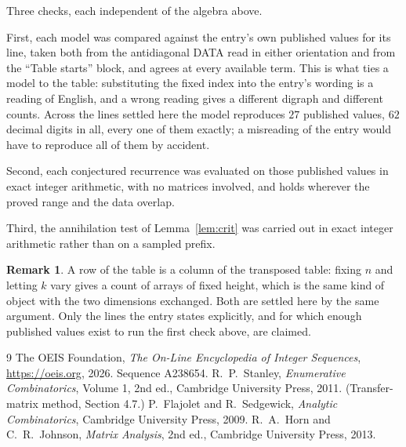 \documentclass[11pt,a4paper]{article}
\theoremstyle{plain}
\theoremstyle{definition}
\newtheorem{remark}[theorem]{Remark}
\begin{document}
Three checks, each independent of the algebra above.

First, each model was compared against the entry's own published values for its line, taken
both from the antidiagonal DATA read in either orientation and from the ``Table starts''
block, and agrees at every available term. This is what ties a model to the table:
substituting the fixed index into the entry's wording is a reading of English, and a wrong
reading gives a different digraph and different counts. Across the lines settled here the
model reproduces $27$ published values, $62$ decimal digits in all, every one of
them exactly; a misreading of the entry would have to reproduce all of them by accident.

Second, each conjectured recurrence was evaluated on those published values in exact
integer arithmetic, with no matrices involved, and holds wherever the proved range and the
data overlap.

Third, the annihilation test of Lemma~\ref{lem:crit} was carried out in exact integer
arithmetic rather than on a sampled prefix.

\begin{remark}
A row of the table is a column of the transposed table: fixing $n$ and letting $k$ vary gives a
count of arrays of fixed height, which is the same kind of object with the two dimensions
exchanged. Both are settled here by the same argument. Only the lines the entry states
explicitly, and for which enough published values exist to run the first check above, are
claimed.
\end{remark}

\begin{thebibliography}{9}
 The OEIS Foundation, \emph{The On-Line Encyclopedia of Integer
Sequences}, \url{https://oeis.org}, 2026. Sequence A238654.
 R.~P.~Stanley, \emph{Enumerative Combinatorics}, Volume 1, 2nd ed.,
Cambridge University Press, 2011. (Transfer-matrix method, Section 4.7.)
 P.~Flajolet and R.~Sedgewick, \emph{Analytic Combinatorics}, Cambridge
University Press, 2009.
 R.~A.~Horn and C.~R.~Johnson, \emph{Matrix Analysis}, 2nd ed., Cambridge
University Press, 2013.
\end{thebibliography}
\end{document}
